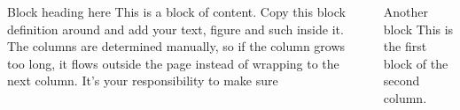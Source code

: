 \documentclass[final]{beamer}
\author{Author Name}
\begin{document}
\begin{frame}[t, fragile]
\begin{columns}[T]
\column{0.05\paperwidth}

\column{0.45\paperwidth}

\begin{block}{Block heading here}
This is a block of content. Copy this block definition around and add your text, figure and such inside it. The columns are determined manually, so if the column grows too long, it flows outside the page instead of wrapping to the next column. It's your responsibility to make sure 
\end{block}



\column{0.45\paperwidth}

\begin{block}{Another block}
This is the first block of the second column.
\end{block}
	

\column{0.05\paperwidth} 
\end{columns}
\end{frame}
\end{document}
